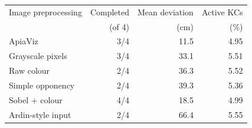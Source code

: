 \begin{tabular}{@{}lrrr@{}}\toprule
Image preprocessing & Completed & Mean deviation & Active KCs \\
 & (of 4) & (cm) & (\%) \\\midrule
ApiaViz & 3/4 & 11.5 & 4.95 \\
Grayscale pixels & 3/4 & 33.1 & 5.51 \\
Raw colour & 2/4 & 36.3 & 5.52 \\
Simple opponency & 2/4 & 39.3 & 5.36 \\
Sobel + colour & 4/4 & 18.5 & 4.99 \\
Ardin-style input & 2/4 & 66.4 & 5.55 \\
\bottomrule\end{tabular}
